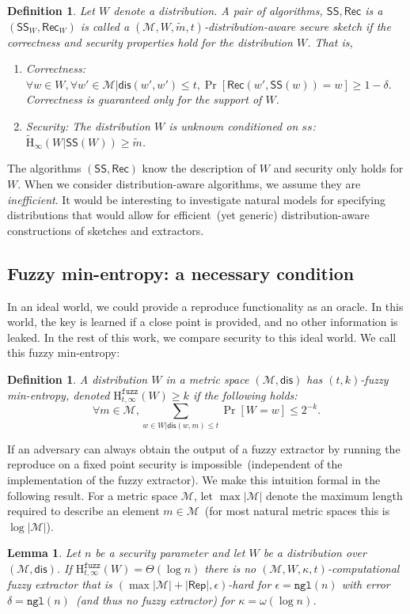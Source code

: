 \documentclass[11pt]{article}
\newcommand{\class}[1]{{\ensuremath{\mathsf{#1}}}}
\newcommand{\rep}{\ensuremath{\class{Rep}}\xspace}
\newcommand{\sketch}{\ensuremath{\class{SS}}\xspace}
\newcommand{\rec}{\ensuremath{\class{Rec}}\xspace}
\newcommand{\dis}{\ensuremath{\mathsf{dis}}}
\newcommand{\ngl}{\ensuremath{\mathtt{ngl}}\xspace}
\newcommand{\Hav}{\tilde{\mathrm{H}}_\infty}
\newcommand{\Hfuzz}{\mathrm{H}^{\mathtt{fuzz}}_{t,\infty}}
\newtheorem{lemma}[theorem]{Lemma}
\newtheorem{definition}[theorem]{Definition}
\begin{document}
\begin{definition}
Let $W$ denote a distribution.  A pair of algorithms, $\sketch, \rec$ is a $(\sketch_W, \rec_W)$ is called a $(\mathcal{M}, W, \tilde{m}, t)$-\emph{distribution-aware secure sketch} if the correctness and security properties hold for the distribution $W$.  That is, 
\begin{enumerate}
\item \emph{Correctness:} 
$
\forall w\in W, \forall w' \in\mathcal{M}| \dis(w',w')\le t, \Pr[\rec(w',\sketch(w))=w]\ge 1-\delta.$
Correctness is guaranteed only for the support of $W$.
\item \emph{Security:} The distribution $W$ is unknown conditioned on $ss$: $\Hav(W|\sketch(W))\geq \tilde{m}$.
\end{enumerate}
\end{definition}
The algorithms $(\sketch, \rec)$ know the description of $W$ and security only holds for $W$.  When we consider distribution-aware algorithms, we assume they are \emph{inefficient}.  It would be interesting to investigate natural models for specifying distributions that would allow for efficient~(yet generic) distribution-aware constructions of sketches and extractors.

\subsection{Fuzzy min-entropy: a necessary condition}
\label{sec:minimal conditions}

In an ideal world, we could provide a reproduce functionality as an oracle.  In this world, the key is learned if a close point is provided, and no other information is leaked.  In the rest of this work, we compare security to this ideal world.  We call this fuzzy min-entropy:

\begin{definition}
\label{def:fuzzy min-ent}
A distribution $W$ in a metric space $(\mathcal{M}, \dis)$ has $(t, k)$-fuzzy min-entropy, denoted $\Hfuzz(W) \ge k$ if the following holds:
\[
\forall m\in \mathcal{M},  \sum_{w\in W | \dis(w, m)\le t} \Pr[W=w] \leq 2^{-k}.
\]
\end{definition}

If an adversary can always obtain the output of a fuzzy extractor by running the reproduce on a fixed point security is impossible~(independent of the implementation of the fuzzy extractor).  We make this intuition formal in the following result.  
For a metric space $\mathcal{M}$, let $\max |\mathcal{M}|$ denote the maximum length required to describe an element $m\in\mathcal{M}$~(for most natural metric spaces this is $\log |\mathcal{M}|$).
\begin{lemma}
\label{lem:fuzz necessary}
Let $n$ be a security parameter and let $W$ be a distribution over $(\mathcal{M}, \dis)$.
If $\Hfuzz (W) = \Theta(\log n)$ there is no $(\mathcal{M}, W, \kappa, t)$-computational fuzzy extractor that is $(\max |\mathcal{M}| +  |\rep|, \epsilon)$-hard for $\epsilon = \ngl(n)$ with error $\delta = \ngl(n)$~(and thus no fuzzy extractor) for $\kappa =\omega(\log n)$.
\end{lemma}
\end{document}
